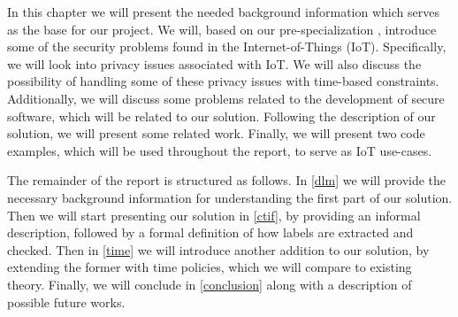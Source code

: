 

In this chapter we will present the needed background information which serves as the base for our project.
We will, based on our pre-specialization \cite{prespecialization}, introduce some of the security problems found in the Internet-of-Things (IoT).
Specifically, we will look into privacy issues associated with IoT.
We will also discuss the possibility of handling some of these privacy issues with time-based constraints.
Additionally, we will discuss some problems related to the development of secure software, which will be related to our solution.
Following the description of our solution, we will present some related work.
Finally, we will present two code examples, which will be used throughout the report, to serve as IoT use-cases.

The remainder of the report is structured as follows.
In \cref{dlm} we will provide the necessary background information for understanding the first part of our solution.
Then we will start presenting our solution in \cref{ctif}, by providing an informal description, followed by a formal definition of how labels are extracted and checked.
Then in \cref{time} we will introduce another addition to our solution, by extending the former with time policies, which we will compare to existing theory.
Finally, we will conclude in \cref{conclusion} along with a description of possible future works.
